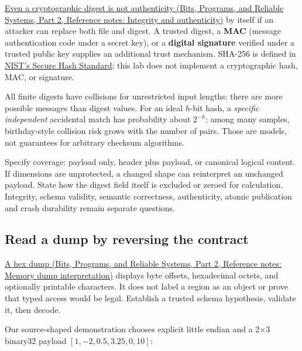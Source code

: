 \href{../01-Bits-Programs-and-Reliable-Systems-P02/main.pdf\#nameddest=appendix-cbe594d1ab0a}{Even a cryptographic digest is not authenticity (Bits, Programs, and Reliable Systems, Part 2, Reference notes: Integrity and authenticity)} by itself if an attacker can replace both file and digest. A trusted digest, a \textbf{MAC} (message authentication code under a secret key), or a \textbf{digital signature} verified under a trusted public key supplies an additional trust mechanism. SHA-256 is defined in \href{https://csrc.nist.gov/pubs/fips/180-4/upd1/final}{NIST's Secure Hash Standard}; this lab does not implement a cryptographic hash, MAC, or signature.

All finite digests have collisions for unrestricted input lengths: there are more possible messages than digest values. For an ideal \(h\)-bit hash, a \emph{specific independent} accidental match has probability about \(2^{-h}\); among many samples, birthday-style collision risk grows with the number of pairs. Those are models, not guarantees for arbitrary checksum algorithms.

Specify coverage: payload only, header plus payload, or canonical logical content. If dimensions are unprotected, a changed shape can reinterpret an unchanged payload. State how the digest field itself is excluded or zeroed for calculation. Integrity, schema validity, semantic correctness, authenticity, atomic publication and crash durability remain separate questions.

\subsection{Read a dump by reversing the contract}\label{05-engine-i-ch002-read-a-dump-by-reversing-the-contract}

\hypertarget{05-engine-i-ch002-read-a-dump-by-reversing-the-contract}{}

\href{../01-Bits-Programs-and-Reliable-Systems-P02/main.pdf\#nameddest=appendix-230b59c0676b}{A hex dump (Bits, Programs, and Reliable Systems, Part 2, Reference notes: Memory dump interpretation)} displays byte offsets, hexadecimal octets, and optionally printable characters. It does not label a region as an object or prove that typed access would be legal. Establish a trusted schema hypothesis, validate it, then decode.

Our source-shaped demonstration chooses explicit little endian and a 2×3 binary32 payload \([1,-2,0.5,3.25,0,10]\):

